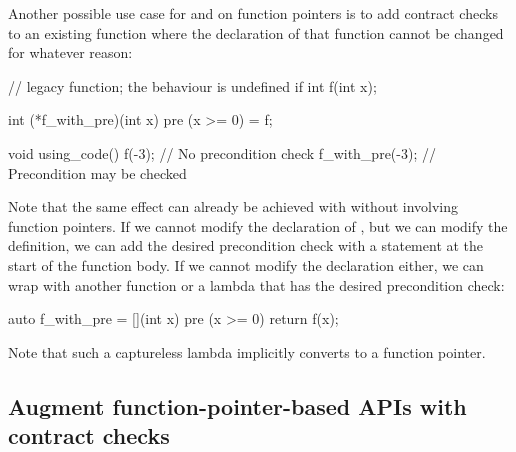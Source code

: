 Another possible use case for  and  on function pointers is to add contract checks to an existing function where the declaration of that function cannot be changed for whatever reason:
\begin{codeblock}
// legacy function; the behaviour is undefined if 
int f(int x);   

int (*f_with_pre)(int x) pre (x >= 0) = f; 

void using_code() {
  f(-3);          // No precondition check
  f_with_pre(-3);  // Precondition may be checked
}
\end{codeblock}

Note that the same effect can already be achieved with \cite{P2900R9} without involving function pointers. If we cannot modify the declaration of , but we can modify the definition, we can add the desired precondition check with a  statement at the start of the function body. If we cannot modify the declaration either, we can wrap  with another function or a lambda that has the desired precondition check:
\begin{codeblock}
auto f_with_pre = [](int x) pre (x >= 0) { return f(x); }
\end{codeblock}
Note that such a captureless lambda implicitly converts to a function pointer.


\subsection{Augment function-pointer-based APIs with contract checks}
\label{usecase_api}

